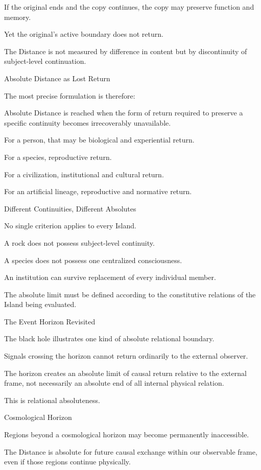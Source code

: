 If the original ends and the copy continues, the copy may preserve function and memory.

Yet the original’s active boundary does not return.

The Distance is not measured by difference in content but by discontinuity of subject-level continuation.

Absolute Distance as Lost Return

The most precise formulation is therefore:

Absolute Distance is reached when the form of return required to preserve a specific continuity becomes irrecoverably unavailable.

For a person, that may be biological and experiential return.

For a species, reproductive return.

For a civilization, institutional and cultural return.

For an artificial lineage, reproductive and normative return.

Different Continuities, Different Absolutes

No single criterion applies to every Island.

A rock does not possess subject-level continuity.

A species does not possess one centralized consciousness.

An institution can survive replacement of every individual member.

The absolute limit must be defined according to the constitutive relations of the Island being evaluated.

The Event Horizon Revisited

The black hole illustrates one kind of absolute relational boundary.

Signals crossing the horizon cannot return ordinarily to the external observer.

The horizon creates an absolute limit of causal return relative to the external frame, not necessarily an absolute end of all internal physical relation.

This is relational absoluteness.

Cosmological Horizon

Regions beyond a cosmological horizon may become permanently inaccessible.

The Distance is absolute for future causal exchange within our observable frame, even if those regions continue physically.

